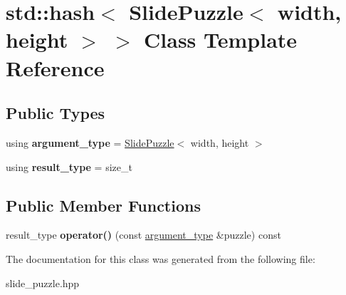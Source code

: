 \hypertarget{classstd_1_1hash_3_01_slide_puzzle_3_01width_00_01height_01_4_01_4}{}\section{std\+:\+:hash$<$ Slide\+Puzzle$<$ width, height $>$ $>$ Class Template Reference}
\label{classstd_1_1hash_3_01_slide_puzzle_3_01width_00_01height_01_4_01_4}
\subsection*{Public Types}
\begin{DoxyCompactItemize}
\item 
\mbox{\label{classstd_1_1hash_3_01_slide_puzzle_3_01width_00_01height_01_4_01_4_a22310cee323e2529f2b59d38bd5fa2cd}} 
using {\bfseries argument\+\_\+type} = \hyperlink{class_slide_puzzle}{Slide\+Puzzle}$<$ width, height $>$
\item 
\mbox{\label{classstd_1_1hash_3_01_slide_puzzle_3_01width_00_01height_01_4_01_4_afae9fb91de9ef083bbfe1f1a45016d36}} 
using {\bfseries result\+\_\+type} = size\+\_\+t
\end{DoxyCompactItemize}
\subsection*{Public Member Functions}
\begin{DoxyCompactItemize}
\item 
\mbox{\label{classstd_1_1hash_3_01_slide_puzzle_3_01width_00_01height_01_4_01_4_a6bf99e4bbcc3c23e58185db4e586687c}} 
result\+\_\+type {\bfseries operator()} (const \hyperlink{class_slide_puzzle}{argument\+\_\+type} \&puzzle) const
\end{DoxyCompactItemize}


The documentation for this class was generated from the following file\+:\begin{DoxyCompactItemize}
\item 
slide\+\_\+puzzle.\+hpp\end{DoxyCompactItemize}
